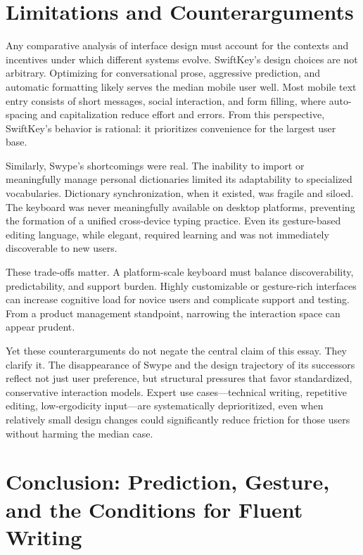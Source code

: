 \documentclass[11pt]{article}
\begin{document}
\section{Limitations and Counterarguments}

Any comparative analysis of interface design must account for the contexts and incentives under which different systems evolve. SwiftKey’s design choices are not arbitrary. Optimizing for conversational prose, aggressive prediction, and automatic formatting likely serves the median mobile user well. Most mobile text entry consists of short messages, social interaction, and form filling, where auto-spacing and capitalization reduce effort and errors. From this perspective, SwiftKey’s behavior is rational: it prioritizes convenience for the largest user base.

Similarly, Swype’s shortcomings were real. The inability to import or meaningfully manage personal dictionaries limited its adaptability to specialized vocabularies. Dictionary synchronization, when it existed, was fragile and siloed. The keyboard was never meaningfully available on desktop platforms, preventing the formation of a unified cross-device typing practice. Even its gesture-based editing language, while elegant, required learning and was not immediately discoverable to new users.

These trade-offs matter. A platform-scale keyboard must balance discoverability, predictability, and support burden. Highly customizable or gesture-rich interfaces can increase cognitive load for novice users and complicate support and testing. From a product management standpoint, narrowing the interaction space can appear prudent.

Yet these counterarguments do not negate the central claim of this essay. They clarify it. The disappearance of Swype and the design trajectory of its successors reflect not just user preference, but structural pressures that favor standardized, conservative interaction models. Expert use cases—technical writing, repetitive editing, low-ergodicity input—are systematically deprioritized, even when relatively small design changes could significantly reduce friction for those users without harming the median case.

\section{Conclusion: Prediction, Gesture, and the Conditions for Fluent Writing}
\end{document}

